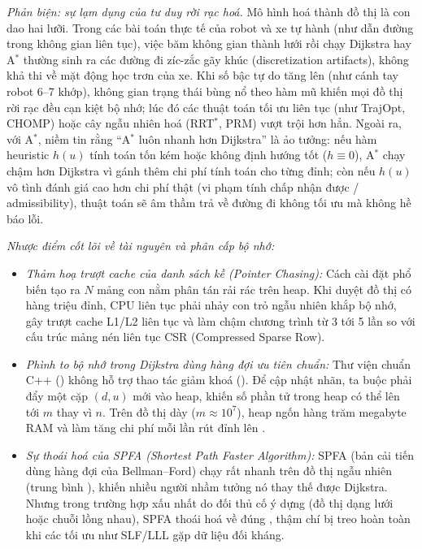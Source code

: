 \documentclass[../../algorithm.tex]{subfiles}
\begin{document}
\emph{Phản biện: sự lạm dụng của tư duy rời rạc hoá.} Mô hình hoá thành đồ thị là con dao hai lưỡi. Trong các bài toán thực tế của robot và xe tự hành (như dẫn đường trong không gian liên tục), việc băm không gian thành lưới rồi chạy Dijkstra hay A\(^\ast\) thường sinh ra các đường đi zíc-zắc gãy khúc (discretization artifacts), không khả thi về mặt động học trơn của xe. Khi số bậc tự do tăng lên (như cánh tay robot 6--7 khớp), không gian trạng thái bùng nổ theo hàm mũ khiến mọi đồ thị rời rạc đều cạn kiệt bộ nhớ; lúc đó các thuật toán tối ưu liên tục (như TrajOpt, CHOMP) hoặc cây ngẫu nhiên hoá (RRT\(^\ast\), PRM) vượt trội hơn hẳn. Ngoài ra, với A\(^\ast\), niềm tin rằng ``A\(^\ast\) luôn nhanh hơn Dijkstra'' là ảo tưởng: nếu hàm heuristic \(h(u)\) tính toán tốn kém hoặc không định hướng tốt (\(h \equiv 0\)), A\(^\ast\) chạy chậm hơn Dijkstra vì gánh thêm chi phí tính toán cho từng đỉnh; còn nếu \(h(u)\) vô tình đánh giá cao hơn chi phí thật (vi phạm tính chấp nhận được / admissibility), thuật toán sẽ âm thầm trả về đường đi không tối ưu mà không hề báo lỗi.

\emph{Nhược điểm cốt lõi về tài nguyên và phân cấp bộ nhớ:}
\begin{itemize}
\item \emph{Thảm hoạ trượt cache của danh sách kề (Pointer Chasing):} Cách cài đặt phổ biến  tạo ra \(N\) mảng con nằm phân tán rải rác trên heap. Khi duyệt đồ thị có hàng triệu đỉnh, CPU liên tục phải nhảy con trỏ ngẫu nhiên khắp bộ nhớ, gây trượt cache L1/L2 liên tục và làm chậm chương trình từ 3 tới 5 lần so với cấu trúc mảng nén liên tục CSR (Compressed Sparse Row).
\item \emph{Phình to bộ nhớ trong Dijkstra dùng hàng đợi ưu tiên chuẩn:} Thư viện chuẩn C++ () không hỗ trợ thao tác giảm khoá (). Để cập nhật nhãn, ta buộc phải đẩy một cặp \((d, u)\) mới vào heap, khiến số phần tử trong heap có thể lên tới \(m\) thay vì \(n\). Trên đồ thị dày (\(m \approx 10^7\)), heap ngốn hàng trăm megabyte RAM và làm tăng chi phí mỗi lần rút đỉnh lên .
\item \emph{Sự thoái hoá của SPFA (Shortest Path Faster Algorithm):} SPFA (bản cải tiến dùng hàng đợi của Bellman--Ford) chạy rất nhanh trên đồ thị ngẫu nhiên (trung bình ), khiến nhiều người nhầm tưởng nó thay thế được Dijkstra. Nhưng trong trường hợp xấu nhất do đối thủ cố ý dựng (đồ thị dạng lưới hoặc chuỗi lồng nhau), SPFA thoái hoá về đúng , thậm chí bị treo hoàn toàn khi các tối ưu như SLF/LLL gặp dữ liệu đối kháng.
\end{itemize}
\end{document}
